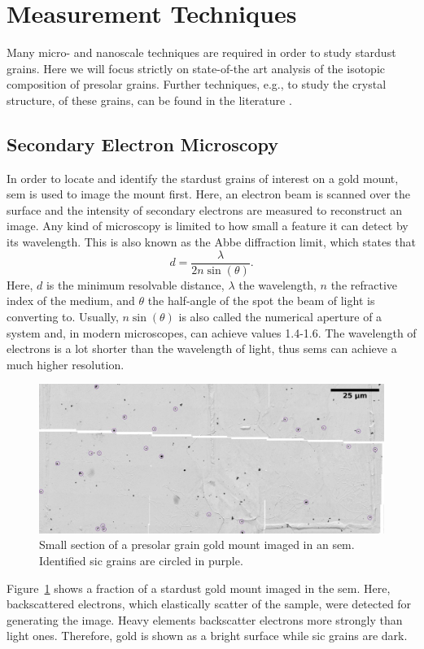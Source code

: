 \section{Measurement Techniques}

Many micro- and nanoscale techniques are required in order to study stardust grains. Here we will focus strictly on state-of-the art analysis of the isotopic composition of presolar grains. Further techniques, e.g., to study the crystal structure, of these grains, can be found in the literature \citep[see, e.g.,][and references therein]{nittler16}.

\subsection{Secondary Electron Microscopy}

In order to locate and identify the stardust grains of interest on a gold mount, \acf{sem} is used to image the mount first. Here, an electron beam is scanned over the surface and the intensity of secondary electrons are measured to reconstruct an image. Any kind of microscopy is limited to how small a feature it can detect by its wavelength. This is also known as the Abbe diffraction limit, which states that
\begin{equation}
    d = \frac{\lambda}{2n\sin(\theta)}.
\end{equation}
Here, $d$ is the minimum resolvable distance, $\lambda$ the wavelength, $n$ the refractive index of the medium, and $\theta$ the half-angle of the spot the beam of light is converting to. Usually, $n\sin(\theta)$ is also called the numerical aperture of a system and, in modern microscopes, can achieve values 1.4-1.6. The wavelength of electrons is a lot shorter than the wavelength of light, thus \acp{sem} can achieve a much higher resolution.
\begin{figure}[tb]
    \centering
    \includegraphics[width=\textwidth]{graphics/stardust/sem_mount-s}
    \caption{Small section of a presolar grain gold mount imaged in an \ac{sem}. Identified \ac{sic} grains are circled in purple.}
    \label{fig:stardust:sem_stardust_mount_map}
\end{figure}
Figure~\ref{fig:stardust:sem_stardust_mount_map} shows a fraction of a stardust gold mount imaged in the \ac{sem}. Here, backscattered electrons, which elastically scatter of the sample, were detected for generating the image. Heavy elements backscatter electrons more strongly than light ones. Therefore, gold is shown as a bright surface while \ac{sic} grains are dark. 

